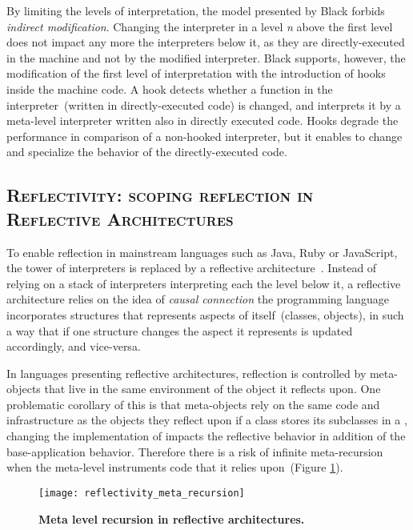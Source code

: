 By limiting the levels of interpretation, the model presented by Black forbids \emph{indirect modification}. Changing the interpreter in a level \emph{n} above the first level does not impact any more the interpreters below it, as they are directly-executed in the machine and not by the modified interpreter. Black supports, however, the modification of the first level of interpretation with the introduction of hooks inside the machine code. A hook detects whether a function in the interpreter~(written in directly-executed code) is changed, and interprets it by a meta-level interpreter written also in directly executed code. Hooks degrade the performance in comparison of a non-hooked interpreter, but it enables to change and specialize the behavior of the directly-executed code.

\subsection*{\textsc{Reflectivity: scoping reflection in Reflective Architectures}}

To enable reflection in mainstream languages such as Java, Ruby or JavaScript, the tower of interpreters is replaced by a reflective architecture~\cite{Maes87a}. Instead of relying on a stack of interpreters interpreting each the level below it, a reflective architecture relies on the idea of \emph{causal connection} \ie the programming language incorporates structures that represents aspects of itself~(\eg classes, objects), in such a way that if one structure changes the aspect it represents is updated accordingly, and vice-versa.


In languages presenting reflective architectures, reflection is controlled by meta-objects that live in the same environment of the object it reflects upon.
One problematic corollary of this is that meta-objects rely on the same code and infrastructure as the objects they reflect upon \eg if a class stores its subclasses in a , changing the  implementation of  impacts the reflective behavior in addition of the base-application behavior.
Therefore there is a risk of infinite meta-recursion when the meta-level instruments code that it relies upon~(Figure \ref{fig:reflectivity_meta_recursion}).

\begin{figure}[ht]
\begin{center}
\texttt{[image: reflectivity\_meta\_recursion]}
\caption{\textbf{Meta level recursion in reflective architectures.}\label{fig:reflectivity_meta_recursion}
 }
\end{center}
\end{figure}

